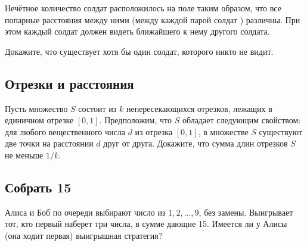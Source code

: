 Нечётное количество солдат расположилось на поле таким образом, что все попарные расстояния между ними (между каждой парой солдат ) различны. 
При этом каждый солдат должен видеть  ближайшего к нему другого солдата.

Докажите, что существует хотя бы один солдат, которого никто не видит.




\subsection*{Отрезки и расстояния}    %


Пусть множество $S$ состоит из $k$ непересекающихся отрезков, лежащих в единичном отрезке $[0,1]$. 
Предположим, что $S$ обладает следующим свойством: для любого вещественного числа $d$ из отрезка $[0,1]$,  в множестве $S$ существуют две точки на расстоянии $d$ друг от друга. 
Докажите, что сумма длин отрезков $S$ не меньше $1/k$.

   
\subsection*{Собрать 15} %

Алиса и Боб по очереди выбирают число из $1, 2,\dots,9$, без замены. 
Выигрывает тот, кто первый наберет три числа, в сумме дающие 15. 
Имеется ли у Алисы (она ходит первая)
выигрышная стратегия?
